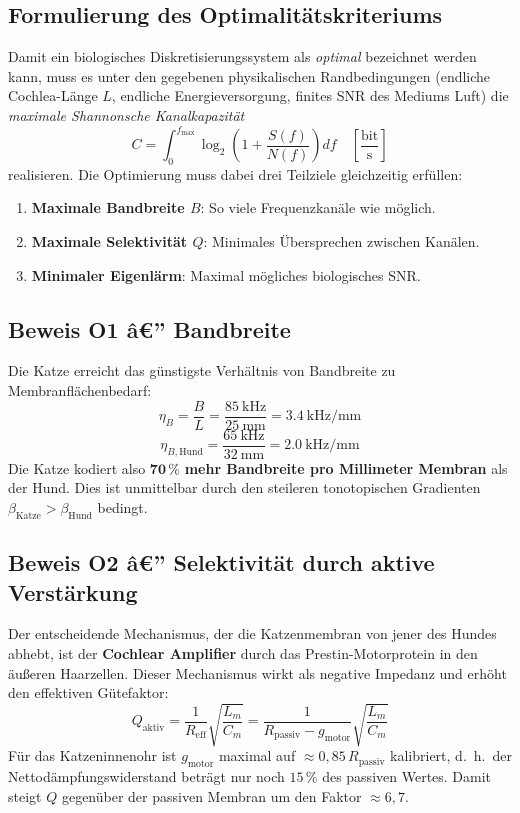 ﻿\documentclass[12pt,a4paper,titlepage]{report}
\begin{document}
\subsection{Formulierung des Optimalitätskriteriums}

Damit ein biologisches Diskretisierungssystem als \emph{optimal} bezeichnet werden kann,
muss es unter den gegebenen physikalischen Randbedingungen
(endliche Cochlea-Länge $L$, endliche Energieversorgung, finites SNR des Mediums Luft)
die \emph{maximale Shannonsche Kanalkapazität}
\[
C = \int_0^{f_{\max}} \log_2\!\left(1 + \frac{S(f)}{N(f)}\right)df \quad \left[\frac{\mathrm{bit}}{\mathrm{s}}\right]
\]
realisieren. Die Optimierung muss dabei drei Teilziele gleichzeitig erfüllen:
\begin{enumerate}[leftmargin=2em, label=\textbf{(O\arabic*)}]
\item \textbf{Maximale Bandbreite $B$}: So viele Frequenzkanäle wie möglich.
\item \textbf{Maximale Selektivität $Q$}: Minimales Übersprechen zwischen Kanälen.
\item \textbf{Minimaler Eigenlärm}: Maximal mögliches biologisches SNR.
\end{enumerate}

\subsection{Beweis O1 â€” Bandbreite}

Die Katze erreicht das günstigste Verhältnis von Bandbreite zu Membranflächenbedarf:
\[
\eta_B = \frac{B}{L} = \frac{\SI{85}{\kilo\hertz}}{\SI{25}{\milli\meter}}
= \SI{3.4}{\kilo\hertz\per\milli\meter}
\]
\[
\eta_{B,\text{Hund}} = \frac{\SI{65}{\kilo\hertz}}{\SI{32}{\milli\meter}}
= \SI{2.0}{\kilo\hertz\per\milli\meter}
\]
Die Katze kodiert also $\mathbf{70\,\%}$ \textbf{mehr Bandbreite pro Millimeter Membran}
als der Hund. Dies ist unmittelbar durch den steileren tonotopischen Gradienten
$\beta_{\text{Katze}} > \beta_{\text{Hund}}$ bedingt.

\subsection{Beweis O2 â€” Selektivität durch aktive Verstärkung}

Der entscheidende Mechanismus, der die Katzenmembran von jener des Hundes abhebt,
ist der \textbf{Cochlear Amplifier} durch das Prestin-Motorprotein in den äußeren Haarzellen.
Dieser Mechanismus wirkt als negative Impedanz und erhöht den effektiven Gütefaktor:
\[
Q_{\text{aktiv}} = \frac{1}{R_{\text{eff}}} \sqrt{\frac{L_m}{C_m}}
= \frac{1}{R_{\text{passiv}} - g_{\text{motor}}} \sqrt{\frac{L_m}{C_m}}
\]
Für das Katzeninnenohr ist $g_{\text{motor}}$ maximal auf
$\approx 0{,}85\,R_{\text{passiv}}$ kalibriert, d.~h.~der Nettodämpfungswiderstand
beträgt nur noch $15\,\%$ des passiven Wertes. Damit steigt $Q$ gegenüber der
passiven Membran um den Faktor $\approx 6{,}7$.
\end{document}

